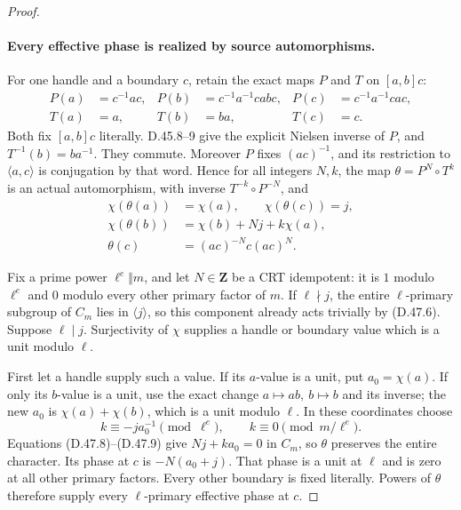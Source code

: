 \begin{proof}
\paragraph{Every effective phase is realized by source automorphisms.}
For one handle and a boundary \(c\), retain the exact maps
\(P\) and \(T\) on \([a,b]c\):
\[
 \begin{aligned}
 P(a)&=c^{-1}ac,&P(b)&=c^{-1}a^{-1}cab c,&
 P(c)&=c^{-1}a^{-1}cac,\\
 T(a)&=a,&T(b)&=ba,&T(c)&=c.
 \end{aligned}
 \tag{D.47.7}
\]
Both fix \([a,b]c\) literally. D.45.8--9 give the
explicit Nielsen inverse of \(P\), and \(T^{-1}(b)=ba^{-1}\).
They commute. Moreover \(P\) fixes \((ac)^{-1}\), and its
restriction to \(\langle a,c\rangle\) is conjugation by that
word. Hence for all integers \(N,k\), the map
\(\theta=P^N\circ T^k\) is an actual automorphism, with
inverse \(T^{-k}\circ P^{-N}\), and
\[
 \begin{split}
  \chi(\theta(a))&=\chi(a),\qquad
  \chi(\theta(c))=j,\\
  \chi(\theta(b))&=\chi(b)+Nj+k\chi(a),\\
  \theta(c)&=(ac)^{-N}c(ac)^N.
 \end{split}
 \tag{D.47.8}
\]

Fix a prime power \(\ell^e\Vert m\), and let
\(N\in\mathbf Z\) be a CRT idempotent: it is \(1\) modulo
\(\ell^e\) and \(0\) modulo every other primary factor of \(m\).
If \(\ell\nmid j\), the entire \(\ell\)-primary subgroup
of \(C_m\) lies in \(\langle j\rangle\), so this component
already acts trivially by \textup{(D.47.6)}.
Suppose \(\ell\mid j\). Surjectivity of \(\chi\) supplies
a handle or boundary value which is a unit modulo \(\ell\).

First let a handle supply such a value. If its \(a\)-value
is a unit, put \(a_0=\chi(a)\). If only its \(b\)-value is
a unit, use the exact change \(a\mapsto ab,\ b\mapsto b\)
and its inverse; the new \(a_0\) is \(\chi(a)+\chi(b)\),
which is a unit modulo \(\ell\). In these coordinates choose
\[
 k\equiv-j a_0^{-1}\pmod{\ell^e},\qquad
 k\equiv0\pmod{m/\ell^e}.
 \tag{D.47.9}
\]
Equations \textup{(D.47.8)--(D.47.9)} give
\(Nj+ka_0=0\) in \(C_m\), so \(\theta\) preserves
the entire character. Its phase at \(c\) is
\(-N(a_0+j)\). That phase is a unit at \(\ell\) and is
zero at all other primary factors. Every other boundary is
fixed literally. Powers of \(\theta\) therefore supply
every \(\ell\)-primary effective phase at \(c\).


\end{proof}
